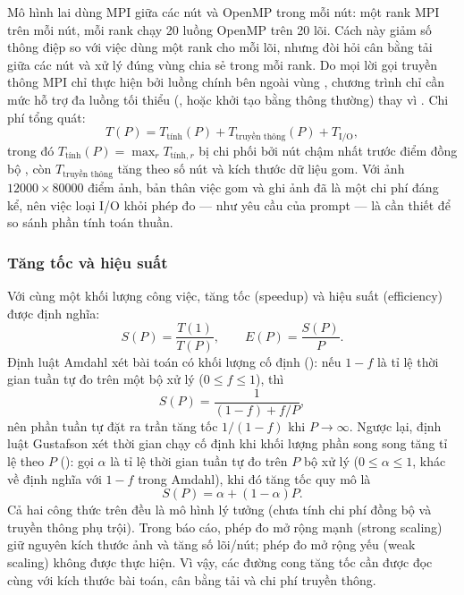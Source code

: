 Mô hình lai dùng MPI giữa các nút và OpenMP trong mỗi nút: một rank MPI trên mỗi
nút, mỗi rank chạy 20 luồng OpenMP trên 20 lõi. Cách này giảm số thông điệp so
với việc dùng một rank cho mỗi lõi, nhưng đòi hỏi cân bằng tải giữa các nút và
xử lý đúng vùng chia sẻ trong mỗi rank. Do mọi lời gọi truyền thông MPI chỉ thực
hiện bởi luồng chính bên ngoài vùng , chương trình chỉ
cần mức hỗ trợ đa luồng tối thiểu (, hoặc khởi tạo
bằng  thông thường) thay vì . Chi phí
tổng quát:
\begin{equation}
  T(P) = T_{\text{tính}}(P) + T_{\text{truyền thông}}(P) + T_{\text{I/O}},
\end{equation}
trong đó $T_{\text{tính}}(P) = \max_r T_{\text{tính},r}$ bị chi phối bởi nút chậm
nhất trước điểm đồng bộ , còn $T_{\text{truyền thông}}$ tăng
theo số nút và kích thước dữ liệu gom. Với ảnh $12000\times80000$ điểm ảnh, bản
thân việc gom và ghi ảnh đã là một chi phí đáng kể, nên việc loại I/O khỏi phép đo
— như yêu cầu của prompt — là cần thiết để so sánh phần tính toán thuần.

\subsubsection{Tăng tốc và hiệu suất}

Với cùng một khối lượng công việc, tăng tốc (speedup) và hiệu suất (efficiency)
được định nghĩa:
\begin{equation}
  S(P) = \frac{T(1)}{T(P)}, \qquad
  E(P) = \frac{S(P)}{P}.
  \label{eq:speedup}
\end{equation}
Định luật Amdahl xét bài toán có khối lượng cố định (): nếu
$1-f$ là tỉ lệ thời gian tuần tự đo trên một bộ xử lý ($0\le f\le 1$), thì
\begin{equation}
  S(P) = \frac{1}{(1-f) + f/P},
  \label{eq:amdahl}
\end{equation}
nên phần tuần tự đặt ra trần tăng tốc $1/(1-f)$ khi $P\to\infty$. Ngược lại, định
luật Gustafson xét thời gian chạy cố định khi khối lượng phần song song tăng tỉ lệ
theo $P$ (): gọi $\alpha$ là tỉ lệ thời gian tuần tự đo trên
$P$ bộ xử lý ($0\le \alpha\le 1$, khác về định nghĩa với $1-f$ trong Amdahl), khi
đó tăng tốc quy mô là
\begin{equation}
  S(P) = \alpha + (1-\alpha)P.
  \label{eq:gustafson}
\end{equation}
Cả hai công thức trên đều là mô hình lý tưởng (chưa tính chi phí đồng bộ và truyền
thông phụ trội). Trong báo cáo, phép đo mở rộng mạnh (strong scaling) giữ nguyên
kích thước ảnh và tăng số lõi/nút; phép đo mở rộng yếu (weak scaling) không được
thực hiện. Vì vậy, các đường cong tăng tốc cần được đọc cùng với kích thước bài
toán, cân bằng tải và chi phí truyền thông.

